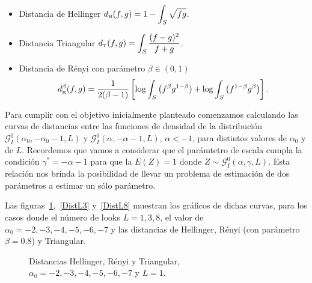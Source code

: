 \begin{itemize}
	\label{dist}
	\item Distancia de Hellinger $d_\text{\tiny H}(f,g)=1-\displaystyle{\int_{S}\sqrt{f g}}$.
	
	
	\item Distancia Triangular $d_\text{\tiny T}(f,g)=\displaystyle{\int_{S}\frac{(f-g)^2}{f+g}}$.
	
	\item Distancia de R\'enyi con parámetro $\beta\in(0,1)$
	$$
	d_\text{\tiny R}^{\beta}(f,g)=\frac{1}{2(\beta-1)}\left[\log\displaystyle{\int_{S}\big({f^{\beta}g^{1-\beta})}+\log\displaystyle{\int_{S}\big(f^{1-\beta}g^{\beta}}}\big)\right].
	$$
\end{itemize}

Para cumplir con el objetivo inicialmente planteado comenzamos calculando las curvas de distancias entre las funciones de densidad de la distribución $\mathcal G_I^0(\alpha_0, -\alpha_0-1, L)$ y $\mathcal G_I^0(\alpha,-\alpha-1,L)$, $\alpha<-1$, para distintos valores de $\alpha_0$ y de $L$. Recordemos que vamos a considerar que el parámtetro de escala cumpla la condición $\gamma^*=-\alpha-1$ para que la $E(Z)=1$ donde $Z \sim \mathcal{G}_I^0(\alpha,\gamma,L)$. Esta relación nos brinda la posibilidad de llevar un problema de estimación de dos parámetros a estimar un sólo parámetro. 

Las figuras~\ref{DistL1},~\ref{DistL3} y~\ref{DistL8} muestran los gráficos de dichas curvas, para los casos donde el número de looks $L=1,3,8$, el valor de $\alpha_0= -2,-3,-4,-5,-6,-7$ y las distancias de Hellinger, Rényi (con parámetro $\beta=0.8$) y Triangular. 

\begin{figure}[h!]
	\centering    
	\caption{\label{DistL1}\small Distancias Hellinger, Rényi y Triangular, $\alpha_0= -2,-3,-4,-5,-6,-7$ y $L=1$.}
\end{figure}


